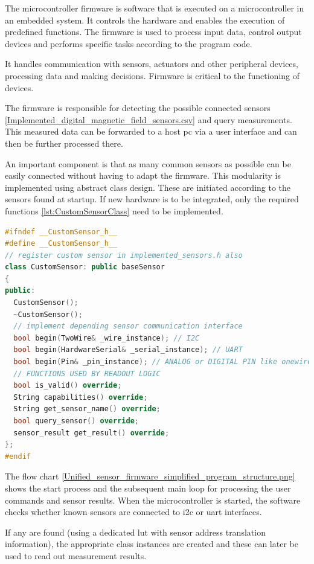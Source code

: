 The microcontroller firmware is software that is executed on a
microcontroller in an embedded system. It controls the hardware and
enables the execution of predefined functions. The firmware is used to
process input data, control output devices and performs specific tasks
according to the program code.

It handles communication with sensors, actuators and other peripheral
devices, processing data and making decisions. Firmware is critical to
the functioning of devices.

The firmware is responsible for detecting the possible connected sensors
\ref{Implemented_digital_magnetic_field_sensors.csv} and query
measurements. This measured data can be forwarded to a host \gls{pc} via
a user interface and can then be further processed there.

An important component is that as many common sensors as possible can be
easily connected without having to adapt the firmware. This modularity
is implemented using abstract class design. These are initiated
according to the sensors found at startup. If new hardware is to be
integrated, only the required functions \ref{lst:CustomSensorClass} need
to be implemented.

\begin{lstlisting}[language={C++}, caption={CustomSensor-Class for adding new sensor hardware support}, label=lst:CustomSensorClass]
#ifndef __CustomSensor_h__
#define __CustomSensor_h__
// register custom sensor in implemented_sensors.h also
class CustomSensor: public baseSensor
{
public:
  CustomSensor();
  ~CustomSensor();
  // implement depending sensor communication interface
  bool begin(TwoWire& _wire_instance); // I2C
  bool begin(HardwareSerial& _serial_instance); // UART
  bool begin(Pin& _pin_instance); // ANALOG or DIGITAL PIN like onewire
  // FUNCTIONS USED BY READOUT LOGIC
  bool is_valid() override;
  String capabilities() override;
  String get_sensor_name() override;
  bool query_sensor() override;
  sensor_result get_result() override;
};
#endif
\end{lstlisting}

The flow chart
\ref{Unified_sensor_firmware_simplified_program_structure.png} shows the
start process and the subsequent main loop for processing the user
commands and sensor results. When the microcontroller is started, the
software checks whether known sensors are connected to \gls{i2c} or
\gls{uart} interfaces.

If any are found (using a dedicated \gls{lut} with sensor address
translation information), the appropriate class instances are created
and these can later be used to read out measurement results.

